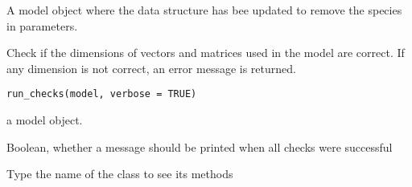 \documentclass[letterpaper]{book}
\begin{document}
%
\begin{Value}
A model object where the data structure has bee updated to remove the
species in parameters.
\end{Value}
%
\begin{Description}\relax
Check if the dimensions of vectors and matrices used in the model are correct.
If any dimension is not correct, an error message is returned.
\end{Description}
%
\begin{Usage}
\begin{verbatim}
run_checks(model, verbose = TRUE)
\end{verbatim}
\end{Usage}
%
\begin{Arguments}
\begin{ldescription}
\item[\code{model}] a model object.

\item[\code{verbose}] Boolean, whether a message should be printed when all checks were successful
\end{ldescription}
\end{Arguments}
%
\begin{Description}\relax
Type the name of the class to see its methods
\end{Description}
%
\end{document}
